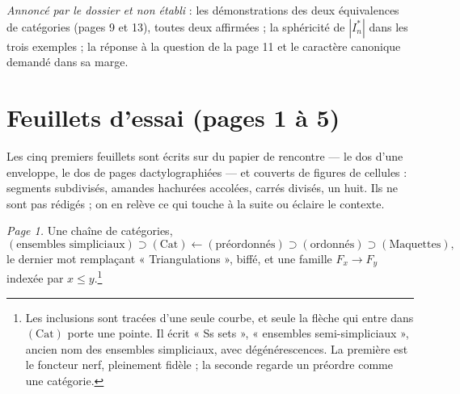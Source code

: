 \documentclass[11pt,a4paper]{article}
\begin{document}
\emph{Annoncé par le dossier et non établi} : les démonstrations des deux
équivalences de catégories (pages 9 et 13), toutes deux affirmées ; la
sphéricité de $|I_{n}^{*}|$ dans les trois exemples ; la réponse à la question
de la page 11 et le caractère canonique demandé dans sa marge.

\section*{Feuillets d'essai (pages 1 à 5)}

Les cinq premiers feuillets sont écrits sur du papier de rencontre --- le dos
d'une enveloppe, le dos de pages dactylographiées --- et couverts de figures de
cellules : segments subdivisés, amandes hachurées accolées, carrés divisés, un
huit. Ils ne sont pas rédigés ; on en relève ce qui touche à la suite ou éclaire
le contexte.

\emph{Page 1.} Une chaîne de catégories,
\[
(\text{ensembles simpliciaux}) \supset (\mathrm{Cat}) \longleftarrow
(\text{préordonnés}) \supset (\text{ordonnés}) \supset (\text{Maquettes}),
\]
le dernier mot remplaçant « Triangulations », biffé, et une famille $F_{x} \to
F_{y}$ indexée par $x \leq y$.\footnote{Les inclusions sont tracées d'une
seule courbe, et seule la flèche qui entre dans $(\mathrm{Cat})$ porte une
pointe. Il écrit « Ss sets », « ensembles semi-simpliciaux », ancien nom des
ensembles simpliciaux, avec dégénérescences. La première est le foncteur nerf, pleinement fidèle ; la seconde
regarde un préordre comme une catégorie.}
\end{document}
